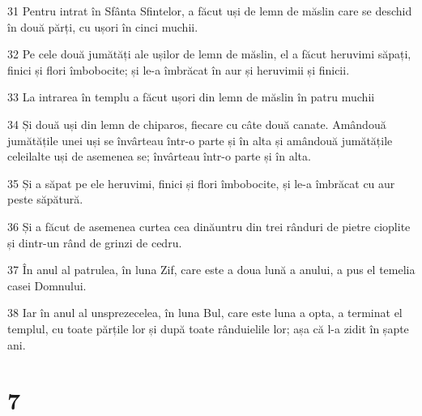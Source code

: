 \par 31 Pentru intrat în Sfânta Sfintelor, a făcut uși de lemn de măslin care se deschid în două părți, cu ușori în cinci muchii.
\par 32 Pe cele două jumătăți ale ușilor de lemn de măslin, el a făcut heruvimi săpați, finici și flori îmbobocite; și le-a îmbrăcat în aur și heruvimii și finicii.
\par 33 La intrarea în templu a făcut ușori din lemn de măslin în patru muchii
\par 34 Și două uși din lemn de chiparos, fiecare cu câte două canate. Amândouă jumătățile unei uși se învârteau într-o parte și în alta și amândouă jumătățile celeilalte uși de asemenea se; învârteau într-o parte și în alta.
\par 35 Și a săpat pe ele heruvimi, finici și flori îmbobocite, și le-a îmbrăcat cu aur peste săpătură.
\par 36 Și a făcut de asemenea curtea cea dinăuntru din trei rânduri de pietre cioplite și dintr-un rând de grinzi de cedru.
\par 37 În anul al patrulea, în luna Zif, care este a doua lună a anului, a pus el temelia casei Domnului.
\par 38 Iar în anul al unsprezecelea, în luna Bul, care este luna a opta, a terminat el templul, cu toate părțile lor și după toate rânduielile lor; așa că l-a zidit în șapte ani.

\chapter{7}

